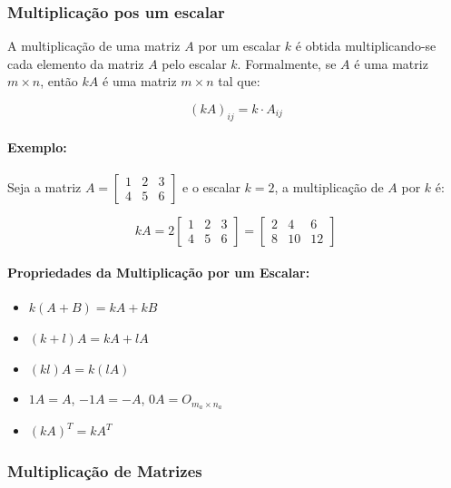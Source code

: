 \subsubsection{Multiplicação pos um escalar}
\indent

A multiplicação de uma matriz $A$ por um escalar $k$ é obtida multiplicando-se cada elemento da matriz $A$ pelo escalar $k$. Formalmente, se $A$ é uma matriz $m \times n$, então $kA$ é uma matriz $m \times n$ tal que:

\[ 
    {(kA)}_{ij} = k \cdot A_{ij} 
\]

\paragraph{Exemplo:}

Seja a matriz $A = \begin{bmatrix}
    1 & 2 & 3 \\ 
    4 & 5 & 6
\end{bmatrix}$ e o escalar $k = 2$, a multiplicação de $A$ por $k$ é:

\[ 
    kA = 2 \begin{bmatrix}
        1 & 2 & 3 \\ 
        4 & 5 & 6
    \end{bmatrix} = \begin{bmatrix}
        2 & 4 & 6 \\ 
        8 & 10 & 12
    \end{bmatrix}
\]

\paragraph{Propriedades da Multiplicação por um Escalar:}

\begin{itemize}
    \item $k(A + B) = kA + kB$
    \item $(k + l)A = kA + lA$
    \item $(kl)A = k(lA)$
    \item $1A = A$, $-1A = -A$, $0A = O_{m_a \times n_a}$
    \item ${(kA)}^T = kA^T$ 
\end{itemize}

\subsubsection{Multiplicação de Matrizes}
\indent

